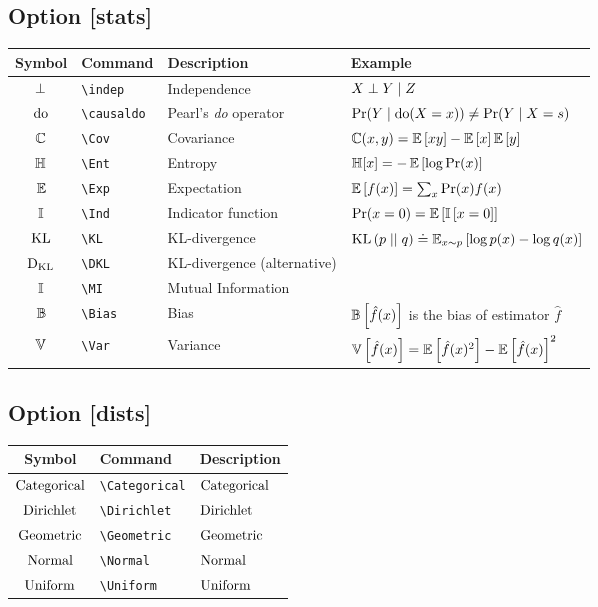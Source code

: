 \documentclass{article}
\begin{document}
\subsection*{Option [stats]}

\begin{tabular}{clll}
  \toprule
  Symbol & Command & Description & Example \\
  \midrule
  $\mathrel{\bot}$ & \verb|\indep| & Independence & $X \mathrel{\bot} Y \mid Z$ \\
  \midrule
  $\operatorname{do}$ & \verb|\causaldo| & Pearl's \emph{do} operator & $\Pr(Y\mid \operatorname{do}(X=x)) \neq \Pr(Y\mid X=s)$ \\
  \midrule
  $\operatorname{\mathbb{C}}$ & \verb|\Cov| & Covariance & $\operatorname{\mathbb{C}}(x, y) = \operatorname{\mathbb{E}}\left[xy\right] - \operatorname{\mathbb{E}}\left[x\right] \operatorname{\mathbb{E}}\left[y\right]$ \\
  $\operatorname{\mathbb{H}}$ & \verb|\Ent| & Entropy & $\operatorname{\mathbb{H}}[x] = -\operatorname{\mathbb{E}}\left[\log\Pr(x) \right]$ \\
  $\operatorname{\mathbb{E}}$ & \verb|\Exp| & Expectation & $\operatorname{\mathbb{E}}\left[ f(x) \right] = \sum_x \Pr(x) f(x)$ \\
  $\operatorname{\mathbb{I}}$ & \verb|\Ind| & Indicator function & $\Pr(x=0) = \operatorname{\mathbb{E}}\left[ \operatorname{\mathbb{I}}\left[ x=0 \right] \right]$ \\
  $\operatorname{KL}$ & \verb|\KL| & KL-divergence & $\operatorname{KL}\left( p \mid\mid q\right) \doteq \operatorname{\mathbb{E}}_{x\sim p}\left[ \log p(x) - \log q(x) \right]$ \\
  $\operatorname{{D_\text{KL}}}$ & \verb|\DKL| & KL-divergence (alternative) & \\
  $\operatorname{\mathbb{I}}$ & \verb|\MI| & Mutual Information & \\
  $\operatorname{\mathbb{B}}$ & \verb|\Bias| & Bias & $\operatorname{\mathbb{B}}\left[\hat f(x)\right]$ is the bias of estimator $\hat f$ \\
  $\operatorname{\mathbb{V}}$ & \verb|\Var| & Variance & $\operatorname{\mathbb{V}}\left[\hat f(x)\right] = \operatorname{\mathbb{E}}\left[\hat f(x)^2\right] - \operatorname{\mathbb{E}}\left[ \hat f(x)\right]^2$ \\
  \bottomrule
\end{tabular}

\subsection*{Option [dists]}

\begin{tabular}{cll}
  \toprule
  Symbol & Command & Description \\
  \midrule
  $\operatorname{Categorical}$ & \verb|\Categorical| & $\operatorname{Categorical}$ \\
  $\operatorname{Dirichlet}$ & \verb|\Dirichlet| & $\operatorname{Dirichlet}$ \\
  $\operatorname{Geometric}$ & \verb|\Geometric| & $\operatorname{Geometric}$ \\
  $\operatorname{Normal}$ & \verb|\Normal| & $\operatorname{Normal}$ \\
  $\operatorname{Uniform}$ & \verb|\Uniform| & $\operatorname{Uniform}$ \\
  \bottomrule
\end{tabular}
\end{document}
